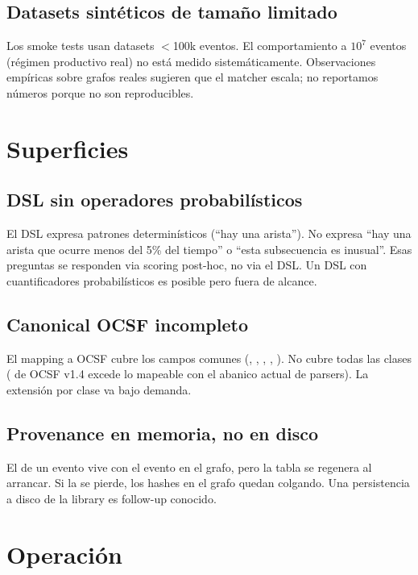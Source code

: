 \subsection*{Datasets sintéticos de tamaño limitado}

Los smoke tests usan datasets $<$100k eventos. El comportamiento a
$10^7$ eventos (régimen productivo real) no está medido
sistemáticamente. Observaciones empíricas sobre grafos reales
sugieren que el matcher escala; no reportamos números porque no
son reproducibles.

\section{Superficies}

\subsection*{DSL sin operadores probabilísticos}

El DSL expresa patrones determinísticos (``hay una arista'').
No expresa ``hay una arista que ocurre menos del 5\% del tiempo''
o ``esta subsecuencia es inusual''. Esas preguntas se
responden via scoring post-hoc, no via el DSL. Un DSL con
cuantificadores probabilísticos es posible pero fuera de
alcance.

\subsection*{Canonical OCSF incompleto}

El mapping a OCSF cubre los campos comunes
(, , , ,
). No cubre todas las clases
( de OCSF v1.4 excede lo mapeable con el
abanico actual de parsers). La extensión por clase va bajo demanda.

\subsection*{Provenance en memoria, no en disco}

El  de un evento vive con el evento
en el grafo, pero la tabla  se
regenera al arrancar. Si la
 se pierde, los hashes en el grafo quedan
colgando. Una persistencia a disco de la library es follow-up
conocido.

\section{Operación}

